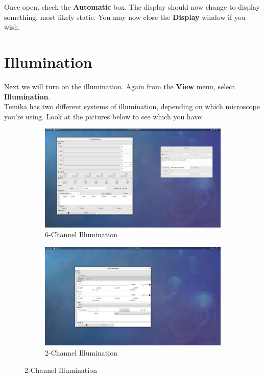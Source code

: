 \documentclass{report}
\begin{document}
Once open, check the \textbf{Automatic} box. The display should now change to display something, most likely static. You may now close the \textbf{Display} window if you wish.





\newpage

\section{Illumination}

Next we will turn on the illumination. Again from the \textbf{View} menu, select \textbf{Illumination}.\\

Temika has two different systems of illumination, depending on which microscope you're using. Look at the pictures below to see which you have:

\begin{figure}[h]
	\begin{subfigure}[b]{0.5\textwidth}
		\includegraphics[width=\textwidth]{illumination}
		\caption{6-Channel Illumination}
	\end{subfigure}
	\begin{subfigure}[b]{0.5\textwidth}
		\includegraphics[width=\textwidth]{illumination_led}
		\caption{2-Channel Illumination}
	\end{subfigure}
\end{figure}
\end{document}
